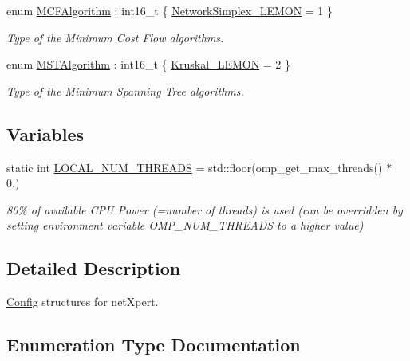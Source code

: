 \begin{DoxyCompactItemize}
\item 
enum \hyperlink{namespacenetxpert_1_1cnfg_aae922390a89b0c9af1bc2532428c5ef9}{M\+C\+F\+Algorithm} \+: int16\+\_\+t \{ \hyperlink{namespacenetxpert_1_1cnfg_aae922390a89b0c9af1bc2532428c5ef9a59fa53b7ea6109479c807547ca718146}{Network\+Simplex\+\_\+\+L\+E\+M\+ON} = 1
 \}\begin{DoxyCompactList}\small\item\em Type of the Minimum Cost Flow algorithms. \end{DoxyCompactList}
\item 
enum \hyperlink{namespacenetxpert_1_1cnfg_ab77ff30f2da32945dbb19bdf6199f799}{M\+S\+T\+Algorithm} \+: int16\+\_\+t \{ \hyperlink{namespacenetxpert_1_1cnfg_ab77ff30f2da32945dbb19bdf6199f799a548b8f5561ba6b0c0e77d67665e37c5a}{Kruskal\+\_\+\+L\+E\+M\+ON} = 2
 \}\begin{DoxyCompactList}\small\item\em Type of the Minimum Spanning Tree algorithms. \end{DoxyCompactList}
\end{DoxyCompactItemize}
\subsection*{Variables}
\begin{DoxyCompactItemize}
\item 
static int \hyperlink{namespacenetxpert_1_1cnfg_ada3b53a68cdf167895c961fba11694aa}{L\+O\+C\+A\+L\+\_\+\+N\+U\+M\+\_\+\+T\+H\+R\+E\+A\+DS} = std\+::floor(omp\+\_\+get\+\_\+max\+\_\+threads() $\ast$ 0.)\hypertarget{namespacenetxpert_1_1cnfg_ada3b53a68cdf167895c961fba11694aa}{}\label{namespacenetxpert_1_1cnfg_ada3b53a68cdf167895c961fba11694aa}

\begin{DoxyCompactList}\small\item\em 80\% of available C\+PU Power (=number of threads) is used (can be overridden by setting environment variable O\+M\+P\+\_\+\+N\+U\+M\+\_\+\+T\+H\+R\+E\+A\+DS to a higher value) \end{DoxyCompactList}\end{DoxyCompactItemize}


\subsection{Detailed Description}
\hyperlink{structnetxpert_1_1cnfg_1_1Config}{Config} structures for net\+Xpert. 

\subsection{Enumeration Type Documentation}
